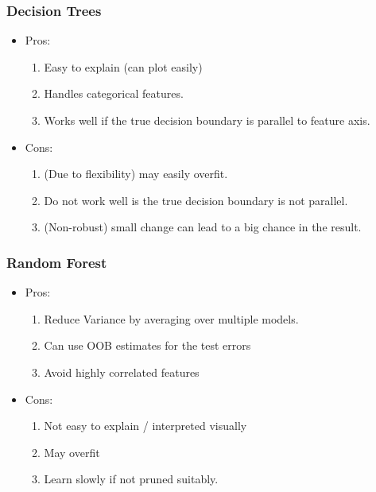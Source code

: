 \documentclass[12pt]{amsart}
\numberwithin{equation}{section}
\theoremstyle{plain}
\theoremstyle{definition}
\begin{document}
\subsubsection{Decision Trees}

\begin{itemize}
\item Pros: 

\begin{enumerate}
\item Easy to explain (can plot easily)
\item Handles categorical features.
\item Works well if the true decision boundary is parallel to feature axis.
\end{enumerate}

\item Cons:

\begin{enumerate}
\item (Due to flexibility) may easily overfit.
\item Do not work well is the true decision boundary is not parallel.
\item (Non-robust) small change can lead to a big chance in the result.
\end{enumerate}

\end{itemize}

\subsubsection{Random Forest}

\begin{itemize}
\item Pros: 
\begin{enumerate}
\item Reduce Variance by averaging over multiple models.
\item Can use OOB estimates for the test errors
\item Avoid highly correlated features
\end{enumerate}

\item Cons:

\begin{enumerate}
\item Not easy to explain / interpreted visually
\item May overfit
\item Learn slowly if not pruned suitably.
\end{enumerate}

\end{itemize}
\end{document}
